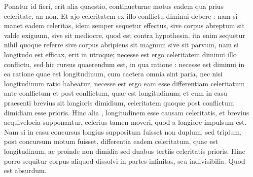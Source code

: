 \pstart Ponatur id fieri, erit alia quaestio, continueturne motus eadem qua prius celeritate, an non. Et ajo celeritatem ex illo conflictu\protect{} diminui debere : nam si manet eadem celeritas\protect{}, idem semper sequetur effectus, sive corpus abreptum sit valde exiguum, sive sit mediocre, quod est contra hypothesin, ita enim sequetur nihil quoque referre sive corpus abripiens sit magnum sive sit parvum, nam si longitudo est efficax\protect{}, erit in utroque; necesse est ergo celeritatem diminui illo conflictu\protect{}, sed hic rursus quaerendum est, in qua ratione : necesse est diminui in ea ratione quae est longitudinum, cum caetera omnia sint paria, nec nisi longitudinum ratio habeatur, necesse est ergo eam esse differentiam celeritatum\protect{} ante conflictum\protect{} et post conflictum\protect{}, quae est longitudinum; et cum in casu praesenti brevius sit longioris dimidium, celeritatem quoque post conflictum\protect{} dimidiam esse prioris. Hinc alia , longitudinem esse causam celeritatis,
 et brevius aequivelocia\protect{} supponantur, celerius tamen moveri, quod a longiore impulsum\protect{} est. Nam si in casu concursus\protect{} longius suppositum fuisset non duplum, sed triplum,  post concursum\protect{} motum fuisset, differentia eadem celeritatum\protect{}, quae est longitudinum, ac proinde non dimidia sed duabus tertiis celeritatis prioris. 
\pend
\pstart%
Hinc porro sequitur corpus aliquod  dissolvi in partes infinitas, seu indivisibilia. Quod est absurdum.
